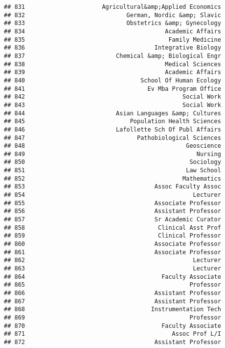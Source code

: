 \documentclass[
]{article}
\begin{document}
\begin{verbatim}
## 831                      Agricultural&amp;Applied Economics
## 832                             German, Nordic &amp; Slavic
## 833                             Obstetrics &amp; Gynecology
## 834                                        Academic Affairs
## 835                                         Family Medicine
## 836                                     Integrative Biology
## 837                          Chemical &amp; Biological Engr
## 838                                        Medical Sciences
## 839                                        Academic Affairs
## 840                                 School Of Human Ecology
## 841                                   Ev Mba Program Office
## 842                                             Social Work
## 843                                             Social Work
## 844                          Asian Languages &amp; Cultures
## 845                              Population Health Sciences
## 846                          Lafollette Sch Of Publ Affairs
## 847                                Pathobiological Sciences
## 848                                              Geoscience
## 849                                                 Nursing
## 850                                               Sociology
## 851                                              Law School
## 852                                             Mathematics
## 853                                     Assoc Faculty Assoc
## 854                                                Lecturer
## 855                                     Associate Professor
## 856                                     Assistant Professor
## 857                                     Sr Academic Curator
## 858                                      Clinical Asst Prof
## 859                                      Clinical Professor
## 860                                     Associate Professor
## 861                                     Associate Professor
## 862                                                Lecturer
## 863                                                Lecturer
## 864                                       Faculty Associate
## 865                                               Professor
## 866                                     Assistant Professor
## 867                                     Assistant Professor
## 868                                    Instrumentation Tech
## 869                                               Professor
## 870                                       Faculty Associate
## 871                                          Assoc Prof L/I
## 872                                     Assistant Professor

\end{verbatim}
\end{document}
